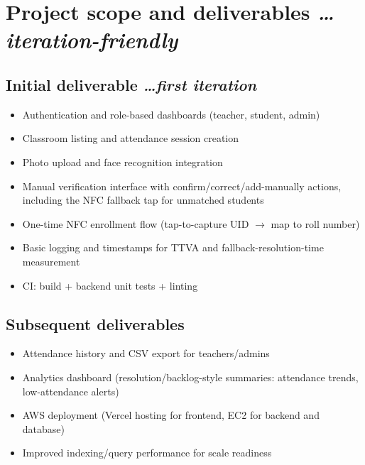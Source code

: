 \documentclass[11pt,a4paper]{article}
\newcommand{\BvrHint}[1]{%
  {\normalfont\normalsize\itshape\hfill #1}}
\begin{document}
\section{Project scope and deliverables %
\BvrHint{\ldots iteration-friendly}}
\subsection{Initial deliverable %
\BvrHint{\ldots first iteration}}
\begin{itemize}[leftmargin=0.7cm]
    \item Authentication and role-based dashboards (teacher, student, admin)
    \item Classroom listing and attendance session creation
    \item Photo upload and face recognition integration
    \item Manual verification interface with confirm/correct/add-manually actions, including the NFC fallback tap for unmatched students
    \item One-time NFC enrollment flow (tap-to-capture UID $\rightarrow$ map to roll number)
    \item Basic logging and timestamps for TTVA and fallback-resolution-time measurement
    \item CI: build + backend unit tests + linting
\end{itemize}

\subsection{Subsequent deliverables}
\begin{itemize}[leftmargin=0.7cm]
    \item Attendance history and CSV export for teachers/admins
    \item Analytics dashboard (resolution/backlog-style summaries: attendance trends, low-attendance alerts)
    \item AWS deployment (Vercel hosting for frontend, EC2 for backend and database)
    \item Improved indexing/query performance for scale readiness
\end{itemize}
\end{document}

